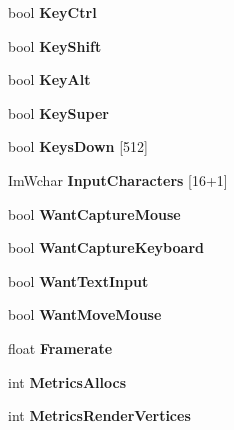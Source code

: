 \begin{DoxyCompactItemize}
bool {\bfseries Key\+Ctrl}
\item 
\mbox{\label{struct_im_gui_i_o_a3c7642214f88862af5b8467f98ac35c9}} 
bool {\bfseries Key\+Shift}
\item 
\mbox{\label{struct_im_gui_i_o_a1e64ef08a4448a2cac874496130992cb}} 
bool {\bfseries Key\+Alt}
\item 
\mbox{\label{struct_im_gui_i_o_afda9e11e21b7ba21573671c38d9f4a81}} 
bool {\bfseries Key\+Super}
\item 
\mbox{\label{struct_im_gui_i_o_a182f42d74cb25a4cf611cc0f776b3848}} 
bool {\bfseries Keys\+Down} \mbox{[}512\mbox{]}
\item 
\mbox{\label{struct_im_gui_i_o_af6283418a2bff9db1522a6245476c7ed}} 
Im\+Wchar {\bfseries Input\+Characters} \mbox{[}16+1\mbox{]}
\item 
\mbox{\label{struct_im_gui_i_o_af5b8add76c5d833a65df19b5456acd7e}} 
bool {\bfseries Want\+Capture\+Mouse}
\item 
\mbox{\label{struct_im_gui_i_o_a458e4ca98d896adb16e3a41ec6d2b811}} 
bool {\bfseries Want\+Capture\+Keyboard}
\item 
\mbox{\label{struct_im_gui_i_o_a0e53197e96187a57b2d86720bf163f4d}} 
bool {\bfseries Want\+Text\+Input}
\item 
\mbox{\label{struct_im_gui_i_o_a0bd366ca18e78bf58f674a355189eaf3}} 
bool {\bfseries Want\+Move\+Mouse}
\item 
\mbox{\label{struct_im_gui_i_o_a8c6c2be54ddeda3cfb4a73cf95701a54}} 
float {\bfseries Framerate}
\item 
\mbox{\label{struct_im_gui_i_o_a9d17ce57fff7919f3ca1584c2186daaf}} 
int {\bfseries Metrics\+Allocs}
\item 
\mbox{\label{struct_im_gui_i_o_a8ec9d203f4543047a8820366c5734529}} 
int {\bfseries Metrics\+Render\+Vertices}

\end{DoxyCompactItemize}

